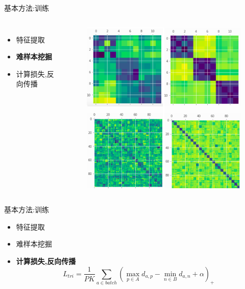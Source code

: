 \documentclass[notes]{beamer}
\begin{document}
\begin{frame}
	{基本方法:训练}
	\begin{columns}
	\begin{itemize}
		\item 特征提取
		\item {\bf 难样本挖掘}
		\item 计算损失,反向传播
	\end{itemize}
	\begin{figure}
		\centering
		\includegraphics[width=\textwidth]{2018-03-12-14-59-27.png}
	\end{figure}
\end{columns} 

\end{frame}

\begin{frame}
	{基本方法:训练} 
	\begin{itemize}
		\item 特征提取
		\item 难样本挖掘
		\item {\bf 计算损失,反向传播}
		\begin{equation} 
			L_{tri}=\frac{1}{PK}\sum_{a \in batch} \left( \max_{p \in A} d_{a,p} -  \min_{n \in B} d_{a,n} +\alpha \right)_+
		\end{equation}
	\end{itemize}
\end{frame}
\end{document}
